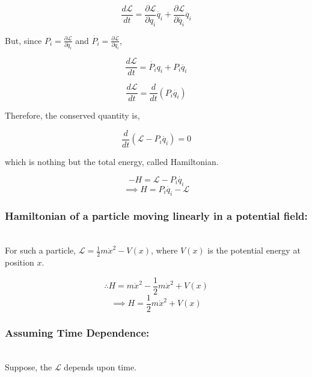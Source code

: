 \documentclass[a4paper]{article}
\newcommand{\Lagr}{\mathcal{L}}
\newcommand{\ddt}{\frac{d}{dt}}
\newcommand{\ddtf}[1]{\frac{d #1}{dt}}
\newcommand{\pdt}[2]{\frac{\partial #1}{\partial #2}}
\newcommand{\half}{\frac{1}{2}}
\begin{document}
			$$ \ddtf{\Lagr} = \pdt{\Lagr}{q_i}\dot{q_i} + \pdt{\Lagr}{\dot{q_i}} \ddot{q_i} $$

			But, since $ P_i = \pdt{\Lagr}{\dot{q_i}} $ and $ \dot{P_i} = \pdt{\Lagr}{q_i} $,

			$$ \ddtf{\Lagr} = \dot{P_i} q_i + P_i \ddot{q_i} $$

			$$ \ddtf{\Lagr} = \ddt(P_i \dot{q_i}) $$

			Therefore, the conserved quantity is,

			\begin{equation}
				\ddt(\Lagr - P_i \dot{q_i}) = 0
			\end{equation}

			which is nothing but the total energy, called Hamiltonian.

			$$ -H = \Lagr - P_i \dot{q_i} $$
			\begin{equation}
				\implies H = P_i \dot{q_i} - \Lagr
			\end{equation}


			\subsubsection*{Hamiltonian of a particle moving linearly in a potential field: }
				\noindent \\

				For such a particle, $\Lagr = \half m \dot{x}^2 - V(x)$, where $V(x)$ is the potential energy at position $x$.

				$$ \therefore H = m\dot{x}^2 - \half m \dot{x}^2 + V(x) $$
				$$ \implies H = \half m \dot{x}^2 + V(x) $$

			\subsubsection*{Assuming Time Dependence: }
				\noindent \\

				Suppose, the $\Lagr$ depends upon time.




\end{document}
